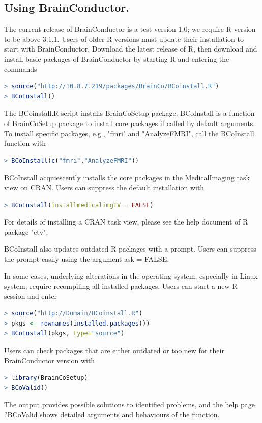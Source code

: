 \documentclass{nature}
\begin{document}
\begin{methods}
\section{Using BrainConductor.} 
The current release of BrainConductor is a test version
1.0; we require R version to be above 3.1.1. Users of older R versions must
update their installation to start with BrainConductor. Download the latest
release of R, then download and install basic packages of BrainConductor by
starting R and entering the commands
\begin{lstlisting}[language = R]
> source("http://10.8.7.219/packages/BrainCo/BCoinstall.R")
> BCoInstall()
\end{lstlisting}
The BCoinstall.R script installs BrainCoSetup package. BCoInstall is a function
of BrainCoSetup package to install core packages if called by default arguments.
To install specific packages, e.g., "fmri" and "AnalyzeFMRI", call the
BCoInstall function with
\begin{lstlisting}[language = R]
> BCoInstall(c("fmri","AnalyzeFMRI"))
\end{lstlisting}
BCoInstall acquiescently installs the core packages in the MedicalImaging task
view on CRAN. Users can suppress the default installation with
\begin{lstlisting}[language = R]
> BCoInstall(installmedicalimgTV = FALSE)
\end{lstlisting}
For details of installing a CRAN task view, please see the help document of R
package "ctv".   

BCoInstall also updates outdated R packages with a prompt. Users can suppress
the prompt easily using the argument ask = FALSE. 

In some cases, underlying alterations in the operating system, especially in
Linux system, require recompiling all installed packages. Users can start a new
R session and enter
\begin{lstlisting}[language = R]
> source("http://Domain/BCoinstall.R")
> pkgs <- rownames(installed.packages())
> BCoInstall(pkgs, type="source")
\end{lstlisting}

Users can check packages that are either outdated or too new for their
BrainConductor version with
\begin{lstlisting}[language = R]
> library(BrainCoSetup)
> BCoValid()
\end{lstlisting}
The output provides possible solutions to identified problems, and the help page
?BCoValid shows detailed arguments and behaviours of the function.
 
 



\end{methods}
\end{document}
